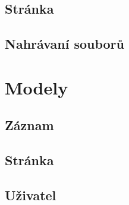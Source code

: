 \subsection{Stránka}
\subsection{Nahrávaní souborů}

\section{Modely}
\subsection{Záznam}
\subsection{Stránka}
\subsection{Uživatel}
